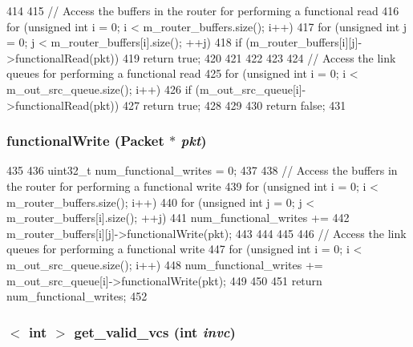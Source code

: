 \begin{DoxyCode}
414 {
415     // Access the buffers in the router for performing a functional read
416     for (unsigned int i = 0; i < m_router_buffers.size(); i++) {
417         for (unsigned int j = 0; j < m_router_buffers[i].size(); ++j) {
418             if (m_router_buffers[i][j]->functionalRead(pkt)) {
419                 return true;
420             }
421         }
422     }
423 
424     // Access the link queues for performing a functional read
425     for (unsigned int i = 0; i < m_out_src_queue.size(); i++) {
426         if (m_out_src_queue[i]->functionalRead(pkt)) {
427             return true;
428         }
429     }
430     return false;
431 }
\end{DoxyCode}
\hypertarget{classRouter_aba9037f662122b5f2e85647d35670e5c}{
\subsubsection[{functionalWrite}]{ functionalWrite ({\bf Packet} $\ast$ {\em pkt})}}
\label{classRouter_aba9037f662122b5f2e85647d35670e5c}



\begin{DoxyCode}
435 {
436     uint32_t num_functional_writes = 0;
437 
438     // Access the buffers in the router for performing a functional write
439     for (unsigned int i = 0; i < m_router_buffers.size(); i++) {
440         for (unsigned int j = 0; j < m_router_buffers[i].size(); ++j) {
441             num_functional_writes +=
442                 m_router_buffers[i][j]->functionalWrite(pkt);
443         }
444     }
445 
446     // Access the link queues for performing a functional write
447     for (unsigned int i = 0; i < m_out_src_queue.size(); i++) {
448         num_functional_writes += m_out_src_queue[i]->functionalWrite(pkt);
449     }
450 
451     return num_functional_writes;
452 }
\end{DoxyCode}
\hypertarget{classRouter_a1a1889612585bf284775701c742a8449}{
\subsubsection[{get\_\-valid\_\-vcs}]{$<$ int $>$ get\_\-valid\_\-vcs (int {\em invc})}}
\label{classRouter_a1a1889612585bf284775701c742a8449}



